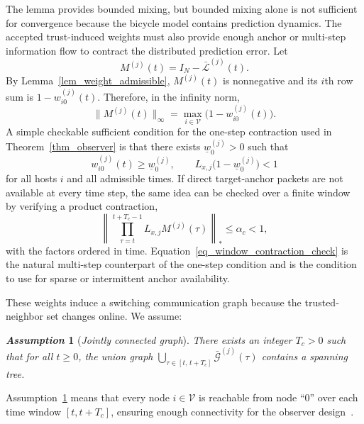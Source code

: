 \documentclass[journal,twoside]{IEEEtran}
\def\V{\mathcal{V}} %
\def\G{\mathcal{G}} %
\def\L{\mathcal{L}} %
\newtheorem{assumption}{\it Assumption}%
\begin{document}
The lemma provides bounded mixing, but bounded mixing alone is not sufficient for convergence because the bicycle model contains prediction dynamics. The accepted trust-induced weights must also provide enough anchor or multi-step information flow to contract the distributed prediction error. Let
\begin{equation}
    M^{(j)}(t)=I_N-\bar{\L}^{(j)}(t).
\end{equation}
By Lemma~\ref{lem_weight_admissible}, $M^{(j)}(t)$ is nonnegative and its $i$th row sum is $1-w_{i0}^{(j)}(t)$. Therefore, in the infinity norm,
\begin{equation}
    \|M^{(j)}(t)\|_{\infty}
    =
    \max_{i\in\V}\big(1-w_{i0}^{(j)}(t)\big).
    \label{eq_M_inf_norm}
\end{equation}
A simple checkable sufficient condition for the one-step contraction used in Theorem~\ref{thm_observer} is that there exists $\underline w_0^{(j)}>0$ such that
\begin{equation}
    w_{i0}^{(j)}(t)\ge \underline w_0^{(j)},\qquad
    L_{x,j}\big(1-\underline w_0^{(j)}\big)<1
    \label{eq_anchor_contraction_check}
\end{equation}
for all hosts $i$ and all admissible times. If direct target-anchor packets are not available at every time step, the same idea can be checked over a finite window by verifying a product contraction,
\begin{equation}
    \left\|
    \prod_{\tau=t}^{t+T_c-1} L_{x,j}M^{(j)}(\tau)
    \right\|_* \le \alpha_c<1,
    \label{eq_window_contraction_check}
\end{equation}
with the factors ordered in time. Equation~\eqref{eq_window_contraction_check} is the natural multi-step counterpart of the one-step condition and is the condition to use for sparse or intermittent anchor availability.

These weights induce a switching communication graph because the trusted-neighbor set changes online. We assume:
\begin{assumption}[\it Jointly connected graph]%
\label{ass_graph}
There exists an integer $T_c > 0$ such that for all $t\geq 0$, the union graph $\bigcup_{\tau\in[t,\,t+T_c]}\bar{\G}^{(j)}(\tau)$ contains a spanning tree.
\end{assumption}
Assumption~\ref{ass_graph} means that every node $i \in\V$ is reachable from node ``0'' over each time window $[t,t+T_c]$, ensuring enough connectivity for the observer design~\cite{hao2024eventtriggered}.
\end{document}
